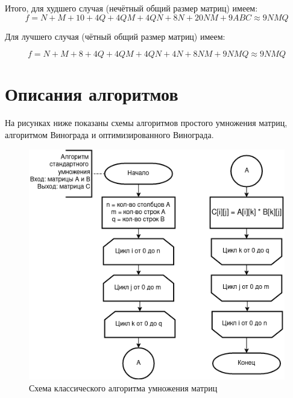 \documentclass[12pt]{report}
\begin{document}
	Итого, для худшего случая (нечётный общий размер матриц) имеем:
	\begin{equation}
	\label{for:bad_impr}
	f = N + M + 10 + 4Q + 4QM + 4QN + 8N + 20NM + 9ABC \approx 9NMQ
	\end{equation}

	Для лучшего случая (чётный общий размер матриц) имеем:
	
	\begin{equation}
	\label{for:good_impr}
	f = N + M + 8 + 4Q +4QM + 4QN + 4N + 8NM + 9NMQ \approx 9NMQ
	\end{equation}
		
	\section{Описания алгоритмов}
	
	На рисунках ниже показаны схемы алгоритмов простого умножения матриц, алгоритмом Винограда и оптимизированного Винограда.
	
	\begin{figure}[H]
		\centering
		\includegraphics{def}
		\caption{Схема классического алгоритма умножения матриц}
		\label{fig:schema_bucket_1}
	\end{figure}
	
\end{document}
